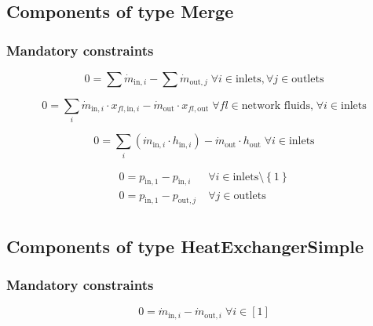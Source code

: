 \documentclass[]{article}
\begin{document}
\subsection{Components of type Merge}

\subsubsection{Mandatory constraints}

\begin{equation}
\label{eq:Merge_mass_flow_constraints}
0 =\sum\dot{m}_{\mathrm{in},i}-\sum\dot{m}_{\mathrm{out},j}\;\forall i \in \text{inlets}, \forall j \in \text{outlets}
\end{equation}

\begin{equation}
\label{eq:Merge_fluid_constraints}
0=\sum_i \dot{m}_{\mathrm{in,}i} \cdot x_{fl\mathrm{,in,}i}- \dot {m}_\mathrm{out} \cdot x_{fl\mathrm{,out}}\; \forall fl \in \text{network fluids,} \; \forall i \in\text{inlets}
\end{equation}

\begin{equation}
\label{eq:Merge_energy_balance_constraints}
0=\sum_i\left(\dot{m}_{\mathrm{in,}i}\cdot h_{\mathrm{in,}i}\right) - \dot{m}_\mathrm{out} \cdot h_\mathrm{out} \; \forall i \in \text{inlets}
\end{equation}

\begin{equation}
\label{eq:Merge_pressure_constraints}
\begin{split}
0 = p_\mathrm{in,1} - p_{\mathrm{in,}i} & \; \forall i \in \text{inlets} \setminus \left\lbrace 1\right\rbrace\\
0 = p_\mathrm{in,1} - p_{\mathrm{out,}j} & \; \forall j \in \text{outlets}\\
\end{split}
\end{equation}


\subsection{Components of type HeatExchangerSimple}

\subsubsection{Mandatory constraints}

\begin{equation}
\label{eq:HeatExchangerSimple_mass_flow_constraints}
0=\dot{m}_{\mathrm{in,}i}-\dot{m}_{\mathrm{out,}i}\; \forall i \in [1]
\end{equation}
\end{document}
